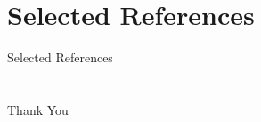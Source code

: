 \documentclass[aspectratio=169,12pt]{beamer}
\begin{document}
	\section{Selected References}
	
	\begin{frame}{Selected References}
		\small
		
		
	\end{frame}
	
	\section*{}
	
	\begin{frame}
		\begin{center}
			{\Huge Thank You}
		\end{center}
	\end{frame}
	
\end{document}
